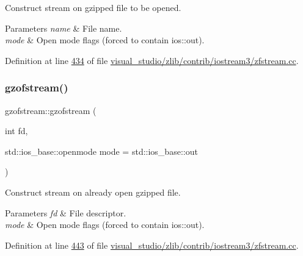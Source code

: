 Construct stream on gzipped file to be opened. 


\begin{DoxyParams}{Parameters}
{\em name} & File name. \\
\hline
{\em mode} & Open mode flags (forced to contain ios\+::out). \\
\hline
\end{DoxyParams}


Definition at line \hyperlink{visual__studio_2zlib_2contrib_2iostream3_2zfstream_8cc_source_l00434}{434} of file \hyperlink{visual__studio_2zlib_2contrib_2iostream3_2zfstream_8cc_source}{visual\+\_\+studio/zlib/contrib/iostream3/zfstream.\+cc}.

\mbox{\label{classgzofstream_aa94d0c8414119a52f2a7f42aa0440941}} 
\subsubsection{\texorpdfstring{gzofstream()}{gzofstream()}\hspace{0.1cm}{\footnotesize\ttfamily [2/4]}}
{\footnotesize\ttfamily gzofstream\+::gzofstream (\begin{DoxyParamCaption}\item[{int}]{fd,  }\item[{std\+::ios\+\_\+base\+::openmode}]{mode = {\ttfamily std\+:\+:ios\+\_\+base\+:\+:out} }\end{DoxyParamCaption})\hspace{0.3cm}{\ttfamily [explicit]}}



Construct stream on already open gzipped file. 


\begin{DoxyParams}{Parameters}
{\em fd} & File descriptor. \\
\hline
{\em mode} & Open mode flags (forced to contain ios\+::out). \\
\hline
\end{DoxyParams}


Definition at line \hyperlink{visual__studio_2zlib_2contrib_2iostream3_2zfstream_8cc_source_l00443}{443} of file \hyperlink{visual__studio_2zlib_2contrib_2iostream3_2zfstream_8cc_source}{visual\+\_\+studio/zlib/contrib/iostream3/zfstream.\+cc}.

\mbox{\label{classgzofstream_a4334d31aab99f8c9c2277b672a55c78f}} 
